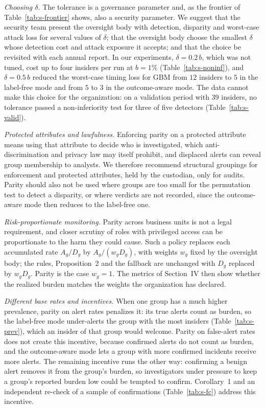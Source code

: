 \documentclass[10pt,onecolumn,letterpaper]{article}
\begin{document}
\emph{Choosing $\delta$.} The tolerance is a governance parameter and, as the frontier of Table~\ref{tab:s-frontier} shows, also a security parameter. We suggest that the security team present the oversight body with detection, disparity and worst-case attack loss for several values of $\delta$; that the oversight body choose the smallest $\delta$ whose detection cost and attack exposure it accepts; and that the choice be revisited with each annual report. In our experiments, $\delta=0.2\,b$, which was not tuned, cost up to four insiders per run at $b=1\%$ (Table~\ref{tab:s-noninf}), and $\delta=0.5\,b$ reduced the worst-case timing loss for GBM from $12$ insiders to $5$ in the label-free mode and from $5$ to $3$ in the outcome-aware mode. The data cannot make this choice for the organization: on a validation period with $39$ insiders, no tolerance passed a non-inferiority test for three of five detectors (Table~\ref{tab:s-valid}).

\emph{Protected attributes and lawfulness.} Enforcing parity on a protected attribute means using that attribute to decide who is investigated, which anti-discrimination and privacy law may itself prohibit, and displaced alerts can reveal group membership to analysts. We therefore recommend structural groupings for enforcement and protected attributes, held by the custodian, only for audits. Parity should also not be used where groups are too small for the permutation test to detect a disparity, or where verdicts are not recorded, since the outcome-aware mode then reduces to the label-free one.

\emph{Risk-proportionate monitoring.} Parity across business units is not a legal requirement, and closer scrutiny of roles with privileged access can be proportionate to the harm they could cause. Such a policy replaces each accumulated rate $A_g/D_g$ by $A_g/(w_gD_g)$, with weights $w_g$ fixed by the oversight body; the rules, Proposition~2 and the fallback are unchanged with $D_g$ replaced by $w_gD_g$. Parity is the case $w_g=1$. The metrics of Section~IV then show whether the realized burden matches the weights the organization has declared.

\emph{Different base rates and incentives.} When one group has a much higher prevalence, parity on alert rates penalizes it: its true alerts count as burden, so the label-free mode under-alerts the group with the most insiders (Table~\ref{tab:s-prev}), which an insider of that group would welcome. Parity on false-alert rates does not create this incentive, because confirmed alerts do not count as burden, and the outcome-aware mode lets a group with more confirmed incidents receive more alerts. The remaining incentive runs the other way: confirming a benign alert removes it from the group's burden, so investigators under pressure to keep a group's reported burden low could be tempted to confirm. Corollary~1 and an independent re-check of a sample of confirmations (Table~\ref{tab:s-fc}) address this incentive.
\end{document}
